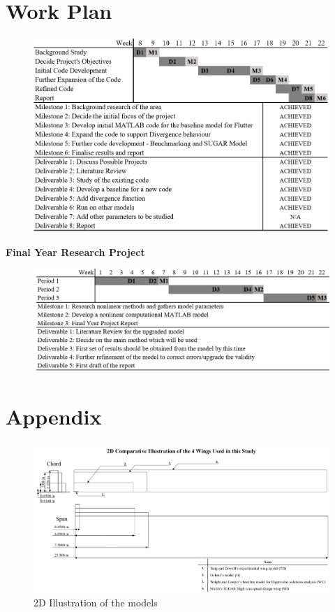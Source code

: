 \documentclass[11pt]{article}
\begin{document}
\section{Work Plan}
\begin{figure}[H]
    \centering
    \includegraphics[width = .9\textwidth]{figures/dandm.png}
\end{figure}

\textbf{Final Year Research Project}
\begin{figure}[H]
    \centering
    \includegraphics[width = .9\textwidth]{figures/fyp.png}
\end{figure}

\cleardoublepage

\newpage

\cleardoublepage
{} 
\section*{Appendix}
\appendix
{}
\label{app:2D-para}
\begin{figure}[H]
    \centering
    \includegraphics[width = .9\textwidth]{figures/para.png}
    \caption{2D Illustration of the models}
    \label{fig:2D-wings}
\end{figure}
\end{document}
